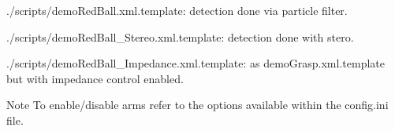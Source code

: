 \begin{DoxyItemize}
\item ./scripts/demo\+Red\+Ball.xml.\+template\+: detection done via particle filter.
\item ./scripts/demo\+Red\+Ball\+\_\+\+Stereo.xml.\+template\+: detection done with stero.
\item ./scripts/demo\+Red\+Ball\+\_\+\+Impedance.xml.\+template\+: as demo\+Grasp.\+xml.\+template but with impedance control enabled.
\end{DoxyItemize}

\begin{DoxyNote}{Note}
To enable/disable arms refer to the options available within the config.\+ini file. 
\end{DoxyNote}
